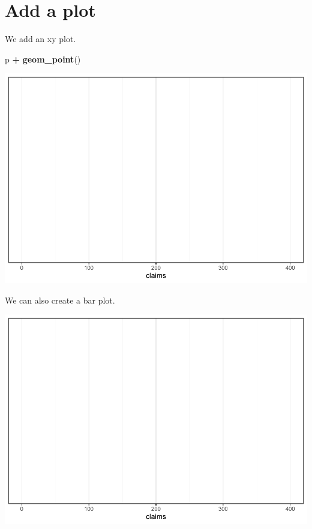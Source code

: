 \documentclass[]{book}
\newenvironment{Shaded}{\begin{snugshade}}{\end{snugshade}}
\newcommand{\DataTypeTok}[1]{\textcolor[rgb]{0.13,0.29,0.53}{#1}}
\newcommand{\KeywordTok}[1]{\textcolor[rgb]{0.13,0.29,0.53}{\textbf{#1}}}
\newcommand{\NormalTok}[1]{#1}
\newcommand{\OperatorTok}[1]{\textcolor[rgb]{0.81,0.36,0.00}{\textbf{#1}}}
\newcommand{\StringTok}[1]{\textcolor[rgb]{0.31,0.60,0.02}{#1}}
\begin{document}
\hypertarget{add-a-plot}{%
\section{Add a plot}\label{add-a-plot}}

We add an xy plot.

\begin{Shaded}
\begin{Highlighting}[]
\NormalTok{p }\OperatorTok{+}\StringTok{ }\KeywordTok{geom_point}\NormalTok{()}
\end{Highlighting}
\end{Shaded}

\includegraphics{Exam-PA-Study-Manual_files/figure-latex/unnamed-chunk-72-1.pdf}

We can also create a bar plot.

\begin{Shaded}
\end{Shaded}

\includegraphics{Exam-PA-Study-Manual_files/figure-latex/unnamed-chunk-73-1.pdf}
\end{document}
